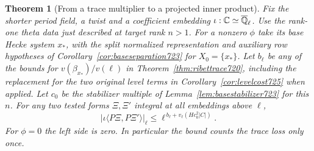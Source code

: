 \documentclass[a4paper,11pt]{article}
\newtheorem{theorem}[proposition]{Theorem}
\theoremstyle{definition}
\theoremstyle{remark}
\numberwithin{equation}{section}
\begin{document}
\begin{theorem}[From a trace multiplier to a projected inner product]
\leavevmode\label{thm:rankonepair736}
Fix the shorter period field, a twist and a coefficient embedding
\(\iota:\mathbb C\simeq\overline{\mathbb Q}_\ell\). Use the rank-one
theta data just described at target rank \(n>1\). For a nonzero
\(\phi\) take its base Hecke system \(x_*\), with the split
normalized representation and auxiliary row hypotheses of
Corollary~\ref{cor:baseseparation723} for \(X_0=\{x_*\}\).
Let \(b_\ell\) be any of the bounds for \(v(\beta_{x_*})/v(\ell)\)
in Theorem~\ref{thm:ribettrace720}, including the replacement for
the two original level terms in Corollary~\ref{cor:levelcost725}
when applied. Let \(c_0\) be the stabilizer multiple of
Lemma~\ref{lem:basestabilizer723} for this \(n\). For any two
tested forms \(\Xi,\Xi'\) integral at all embeddings above \(\ell\),
\[
  \bigl|\iota\langle P\Xi,P\Xi'\rangle\bigr|_\ell
       \le \ell^{\,b_\ell+v_\ell(Hc_0^2|C|)} .
\]
For \(\phi=0\) the left side is zero. In particular the bound
counts the trace loss only once.
\end{theorem}
\end{document}
